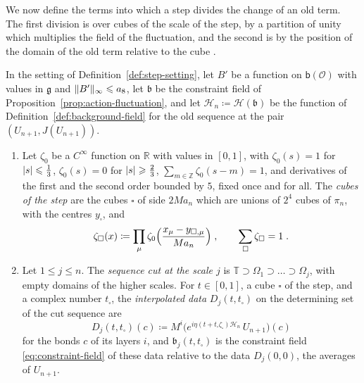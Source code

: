 \documentclass[11pt]{preprint}
\DeclarePairedDelimiter{\abs}{\lvert}{\rvert}
\DeclarePairedDelimiter{\norm}{\lVert}{\rVert}
\numberwithin{equation}{section}
\begin{document}
We now define the terms into which a step divides the change of an old term. The first division is over cubes of the scale of the step, by a partition of unity which multiplies the field of the fluctuation, and the second is by the position of the domain of the old term relative to the cube \cite[(3.3)--(3.9), (3.15)--(3.17), pp.~270--273]{BalabanRG1}.

\begin{definition}\label{def:step-cubes}
In the setting of Definition~\ref{def:step-setting}, let $B'$ be a function on $\mathsf b(\mathcal O)$ with values in $\mathfrak g$ and $\norm{B'}_\infty \leqslant a_8$, let $\mathfrak b$ be the constraint field of Proposition~\ref{prop:action-fluctuation}, and let $\mathcal H_n \coloneqq \mathcal H(\mathfrak b)$ be the function of Definition~\ref{def:background-field} for the old sequence at the pair $(U_{n+1}, J(U_{n+1}))$.
\begin{enumerate}[label=(\roman*)]
\item Let $\zeta_0$ be a $C^\infty$ function on $\mathbb R$ with values in $[0, 1]$, with $\zeta_0(s) = 1$ for $\abs s \leqslant \frac{1}{3}$, $\zeta_0(s) = 0$ for $\abs s \geqslant \frac{2}{3}$, $\sum_{m \in \mathbb Z}\zeta_0(s - m) = 1$, and derivatives of the first and the second order bounded by $5$, fixed once and for all. The \emph{cubes of the step} are the cubes $\square$ of side $2Ma_n$ which are unions of $2^4$ cubes of $\pi_n$, with the centres $y_\square$, and
\begin{equation}\label{eq:cube-partition}
    \zeta_\square(x) \coloneqq \prod_{\mu}\zeta_0\Bigl(\frac{x_\mu - y_{\square,\mu}}{Ma_n}\Bigr)\;,
    \qquad
    \sum_\square\zeta_\square = 1\;.
\end{equation}
\item Let $1 \leqslant j \leqslant n$. The \emph{sequence cut at the scale $j$} is $\mathbb T \supset \Omega_1 \supset \dots \supset \Omega_j$, with empty domains of the higher scales. For $t \in [0, 1]$, a cube $\square$ of the step, and a complex number $t_\square$, the \emph{interpolated data} $D_j(t, t_\square)$ on the determining set of the cut sequence are
\begin{equation}\label{eq:interpolated-data}
    D_j(t, t_\square)(c) \coloneqq M^i\bigl(e^{i\eta(t + t_\square\zeta_\square)\mathcal H_n}\,U_{n+1}\bigr)(c)
\end{equation}
for the bonds $c$ of its layers $i$, and $\mathfrak b_j(t, t_\square)$ is the constraint field \eqref{eq:constraint-field} of these data relative to the data $D_j(0, 0)$, the averages of $U_{n+1}$.

\end{enumerate}
\end{definition}
\end{document}
